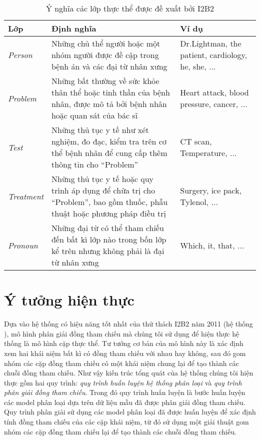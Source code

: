 \begin{table}[th]
\centering{}
\caption{Ý nghĩa các lớp thực thể được đề xuất bởi I2B2\label{tab:EntityLabels}}
\footnotesize\sffamily

\begin{tabularx}{\textwidth}{@{}lLP{\colleft}{0.3}@{}}
\toprule
\textbf{Lớp} & \textbf{Định nghĩa} & \textbf{Ví dụ}\\
\midrule
\emph{Person} & Những chủ thể người hoặc một nhóm người được đề cập trong bệnh án và các đại từ nhân xưng & Dr.Lightman, the patient, cardiology, he, she, ...\\
\emph{Problem} & Những bất thường về sức khỏe thân thể hoặc tinh thần của bệnh nhân, được mô tả bởi bệnh nhân hoặc quan sát của bác sĩ & Heart attack, blood pressure, cancer, ...\\
\emph{Test} & Những thủ tục y tế như xét nghiệm, đo đạc, kiểm tra trên cơ thể bệnh nhân để cung cấp thêm thông tin cho ``Problem'' & CT scan, Temperature, ...\\
\emph{Treatment} & Những thủ tục y tế hoặc quy trình áp dụng để chữa trị cho ``Problem'', bao gồm thuốc, phẫu thuật hoặc phương pháp điều trị & Surgery, ice pack, Tylenol, ...\\
\emph{Pronoun} & Những đại từ có thể tham chiếu đến bất kì lớp nào trong bốn lớp kể trên nhưng không phải là đại từ nhân xưng & Which, it, that, ...\\
\bottomrule
\end{tabularx}
\end{table}

\section{Ý tưởng hiện thực\label{ytuonghienthuc}}
Dựa vào hệ thống có hiệu năng tốt nhất của thử thách I2B2 năm 2011 (hệ thống \cite{YanXu2012}), mô hình phân giải đồng tham chiếu mà chúng tôi sử dụng để hiện thực hệ thống là mô hình cặp thực thể. Tư tưởng cơ bản của mô hình này là xác định xem hai khái niệm bất kì có đồng tham chiếu với nhau hay không, sau đó gom nhóm các cặp đồng tham chiếu có một khái niệm chung lại để tạo thành các chuỗi đồng tham chiếu. Như vậy kiến trúc tổng quát của hệ thống chúng tôi hiện thực gồm hai quy trình: \emph{quy trình huấn luyện hệ thống phân loại} và \emph{quy trình phân giải đồng tham chiếu}. Trong đó quy trình huấn luyện là bước huấn luyện các model phân loại dựa trên dữ liệu mẫu đã được phân giải đồng tham chiếu. Quy trình phân giải sử dụng các model phân loại đã được huấn luyện để xác định tính đồng tham chiếu của các cặp khái niệm, từ đó sử dụng một giải thuật gom nhóm các cặp đồng tham chiếu lại để tạo thành các chuỗi đồng tham chiếu.

